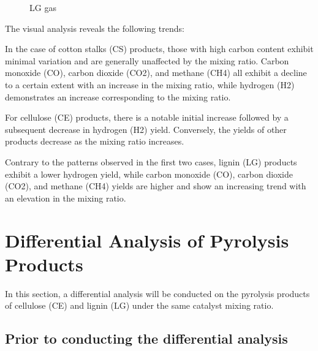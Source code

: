 \documentclass{swmcmthesis}
\begin{document}
\begin{figure}[h!t]
    \centering
    \hfill
    \caption{LG gas}
\end{figure}

The visual analysis reveals the following trends:

In the case of cotton stalks (CS) products, those with high carbon content exhibit minimal variation and are generally unaffected by the mixing ratio. Carbon monoxide (CO), carbon dioxide (CO2), and methane (CH4) all exhibit a decline to a certain extent with an increase in the mixing ratio, while hydrogen (H2) demonstrates an increase corresponding to the mixing ratio.

For cellulose (CE) products, there is a notable initial increase followed by a subsequent decrease in hydrogen (H2) yield. Conversely, the yields of other products decrease as the mixing ratio increases.

Contrary to the patterns observed in the first two cases, lignin (LG) products exhibit a lower hydrogen yield, while carbon monoxide (CO), carbon dioxide (CO2), and methane (CH4) yields are higher and show an increasing trend with an elevation in the mixing ratio.

\section{Differential Analysis of Pyrolysis Products}

In this section, a differential analysis will be conducted on the pyrolysis products of cellulose (CE) and lignin (LG) under the same catalyst mixing ratio.

\subsection{Prior to conducting the differential analysis}
\end{document}
